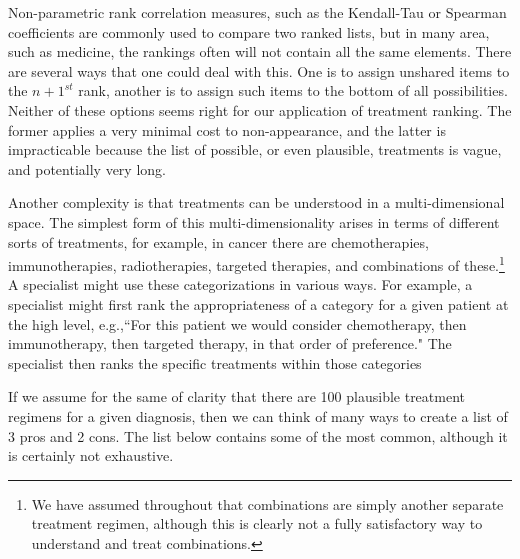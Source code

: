 \documentclass{article}
\begin{document}
Non-parametric rank correlation measures, such as the Kendall-Tau or Spearman coefficients are commonly used to compare two ranked lists, but in many area, such as medicine, the rankings often will not contain all the same elements. There are several ways that one could deal with this. One is to assign unshared items to the $n+1^{st}$ rank, another is to assign such items to the bottom of all possibilities. Neither of these options seems right for our application of treatment ranking. The former applies a very minimal cost to non-appearance, and the latter is impracticable because the list of possible, or even plausible, treatments is vague, and potentially very long. 

Another complexity is that treatments can be understood in a multi-dimensional space. The simplest form of this multi-dimensionality arises in terms of different sorts of treatments, for example, in cancer there are chemotherapies, immunotherapies, radiotherapies, targeted therapies, and combinations of these.\footnote{We have assumed throughout that combinations are simply another separate treatment regimen, although this is clearly not a fully satisfactory way to understand and treat combinations.} A specialist might use these categorizations in various ways. For example, a specialist might first rank the appropriateness of a category for a given patient at the high level, e.g.,``For this patient we would consider chemotherapy, then immunotherapy, then targeted therapy, in that order of preference." The specialist then ranks the specific treatments within those categories

If we assume for the same of clarity that there are 100 plausible treatment regimens for a given diagnosis, then we can think of many ways to create a list of 3 pros and 2 cons. The list below contains some of the most common, although it is certainly not exhaustive.
\end{document}
